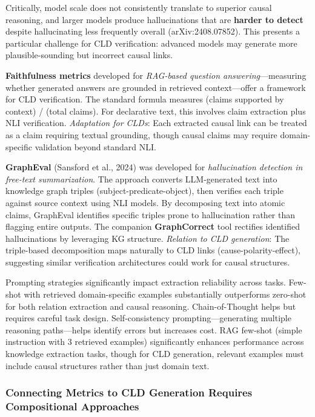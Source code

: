 Critically, model scale does not consistently translate to superior causal reasoning, and larger models produce hallucinations that are \textbf{harder to detect} despite hallucinating less frequently overall (arXiv:2408.07852). This presents a particular challenge for CLD verification: advanced models may generate more plausible-sounding but incorrect causal links.

\textbf{Faithfulness metrics} developed for \textit{RAG-based question answering}---measuring whether generated answers are grounded in retrieved context---offer a framework for CLD verification. The standard formula measures (claims supported by context) / (total claims). For declarative text, this involves claim extraction plus NLI verification. \textit{Adaptation for CLDs}: Each extracted causal link can be treated as a claim requiring textual grounding, though causal claims may require domain-specific validation beyond standard NLI.

\textbf{GraphEval} (Sansford et al., 2024) was developed for \textit{hallucination detection in free-text summarization}. The approach converts LLM-generated text into knowledge graph triples (subject-predicate-object), then verifies each triple against source context using NLI models. By decomposing text into atomic claims, GraphEval identifies specific triples prone to hallucination rather than flagging entire outputs. The companion \textbf{GraphCorrect} tool rectifies identified hallucinations by leveraging KG structure. \textit{Relation to CLD generation}: The triple-based decomposition maps naturally to CLD links (cause-polarity-effect), suggesting similar verification architectures could work for causal structures.

Prompting strategies significantly impact extraction reliability across tasks. Few-shot with retrieved domain-specific examples substantially outperforms zero-shot for both relation extraction and causal reasoning. Chain-of-Thought helps but requires careful task design. Self-consistency prompting---generating multiple reasoning paths---helps identify errors but increases cost. RAG few-shot (simple instruction with 3 retrieved examples) significantly enhances performance across knowledge extraction tasks, though for CLD generation, relevant examples must include causal structures rather than just domain text.

\subsubsection{Connecting Metrics to CLD Generation Requires Compositional Approaches}

